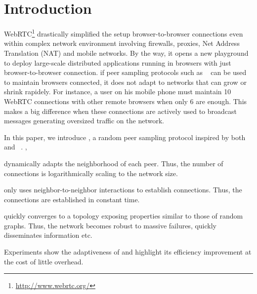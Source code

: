 
\section{Introduction}


WebRTC\footnote{\url{http://www.webrtc.org/}} drastically simplified
the setup browser-to-browser connections even within complex network
environment involving firewalls, proxies, Net Address Translation
(NAT) and mobile networks. By the way, it opens a new playground to
deploy large-scale distributed applications running in browsers with
just browser-to-browser connection. if peer sampling protocols such as
\CYCLON~\cite{voulgaris2005cyclon} can be used to maintain browsers
connected, it does not adapt to networks that can grow or shrink
rapidely. For instance, a user on his mobile phone must maintain 10
WebRTC connections with other remote browsers when only 6 are
enough. This makes a big difference when these connections are
actively used to broadcast messages generating oversized traffic on
the network.

In this paper, we introduce \SPRAY, a random peer sampling protocol inspired by
both \SCAMP~\cite{ganesh2003peer}
and \CYCLON~\cite{voulgaris2005cyclon}. ,
\begin{inparaenum}[(i)]
\item \SPRAY dynamically adapts the neighborhood of each peer. Thus, the number
  of connections is logarithmically scaling to the network size.
\item \SPRAY only uses neighbor-to-neighbor interactions to establish
  connections. Thus, the connections are established in constant time.
\item \SPRAY quickly converges to a topology exposing properties similar to
  those of random graphs. Thus, the network becomes robust to massive failures,
  quickly disseminates information etc.
\item Experiments show the adaptiveness of \SPRAY and highlight its efficiency
  improvement at the cost of little overhead.
\end{inparaenum}

